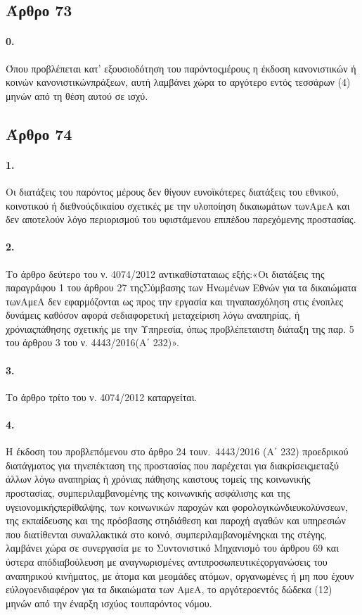 \documentclass[a4paper,oneside, 10pt]{book}
\begin{document}
\subsection*{ Άρθρο 73 }
\paragraph { 0. } Όπου προβλέπεται κατ’ εξουσιοδότηση του παρόντοςμέρους η έκδοση κανονιστικών ή κοινών κανονιστικώνπράξεων, αυτή λαμβάνει χώρα το αργότερο εντός τεσσάρων (4) μηνών από τη θέση αυτού σε ισχύ.
\subsection*{ Άρθρο 74 }
\paragraph { 1. } Οι διατάξεις του παρόντος μέρους δεν θίγουν ευνοϊκότερες διατάξεις του εθνικού, κοινοτικού ή διεθνούςδικαίου σχετικές με την υλοποίηση δικαιωμάτων τωνΑμεΑ και δεν αποτελούν λόγο περιορισμού του υφιστάμενου επιπέδου παρεχόμενης προστασίας.
\paragraph { 2. } Το άρθρο δεύτερο του ν. 4074/2012 αντικαθίσταταιως εξής:«Οι διατάξεις της παραγράφου 1 του άρθρου 27 τηςΣύμβασης των Ηνωμένων Εθνών για τα δικαιώματα τωνΑμεΑ δεν εφαρμόζονται ως προς την εργασία και τηναπασχόληση στις ένοπλες δυνάμεις καθόσον αφορά σεδιαφορετική μεταχείριση λόγω αναπηρίας, ή χρόνιαςπάθησης σχετικής με την Υπηρεσία, όπως προβλέπεταιστη διάταξη της παρ. 5 του άρθρου 3 του ν. 4443/2016(Α΄ 232)».
\paragraph { 3. } Το άρθρο τρίτο του ν. 4074/2012 καταργείται.
\paragraph { 4. } Η έκδοση του προβλεπόμενου στο άρθρο 24 τουν. 4443/2016 (Α΄ 232) προεδρικού διατάγματος για τηνεπέκταση της προστασίας που παρέχεται για διακρίσειςμεταξύ άλλων λόγω αναπηρίας ή χρόνιας πάθησης καιστους τομείς της κοινωνικής προστασίας, συμπεριλαμβανομένης της κοινωνικής ασφάλισης και της υγειονομικήςπερίθαλψης, των κοινωνικών παροχών και φορολογικώνδιευκολύνσεων, της εκπαίδευσης και της πρόσβασης στηδιάθεση και παροχή αγαθών και υπηρεσιών που διατίθενται συναλλακτικά στο κοινό, συμπεριλαμβανομένηςκαι της στέγης, λαμβάνει χώρα σε συνεργασία με το Συντονιστικό Μηχανισμό του άρθρου 69 και ύστερα απόδιαβούλευση με αναγνωρισμένες αντιπροσωπευτικέςοργανώσεις του αναπηρικού κινήματος, με άτομα και μεομάδες ατόμων, οργανωμένες ή μη που έχουν εύλογοενδιαφέρον για τα δικαιώματα των ΑμεΑ, το αργότεροεντός δώδεκα (12) μηνών από την έναρξη ισχύος τουπαρόντος νόμου.
\end{document}
